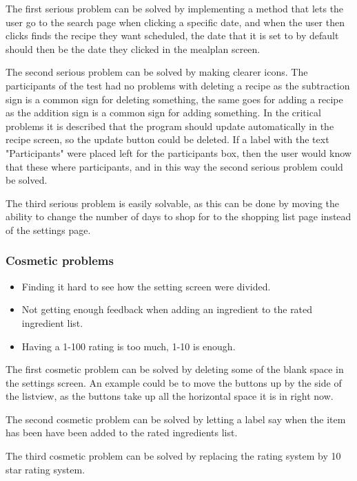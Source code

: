 The first serious problem can be solved by implementing a method that lets the user go to the search page when clicking a specific date, and when the user then clicks finds the recipe they want scheduled, the date that it is set to by default should then be the date they clicked in the mealplan screen.

The second serious problem can be solved by making clearer icons. The participants of the test had no problems with deleting a recipe as the subtraction sign is a common sign for deleting something, the same goes for adding a recipe as the addition sign is a common sign for adding something. In the critical problems it is described that the program should update automatically in the recipe screen, so the update button could be deleted. If a label with the text "Participants" were placed left for the participants box, then the user would know that these where participants, and in this way the second serious problem could be solved.

The third serious problem is easily solvable, as this can be done by moving the ability to change the number of days to shop for to the shopping list page instead of the settings page.

\subsubsection{Cosmetic problems}

\begin{itemize}
    \item Finding it hard to see how the setting screen were divided.
    \item Not getting enough feedback when adding an ingredient to the rated ingredient list.
    \item Having a 1-100 rating is too much, 1-10 is enough.
\end{itemize}

The first cosmetic problem can be solved by deleting some of the blank space in the settings screen. An example could be to move the buttons up by the side of the listview, as the buttons take up all the horizontal space it is in right now.

The second cosmetic problem can be solved by letting a label say when the item has been have been added to the rated ingredients list.

The third cosmetic problem can be solved by replacing the rating system by 10 star rating system.